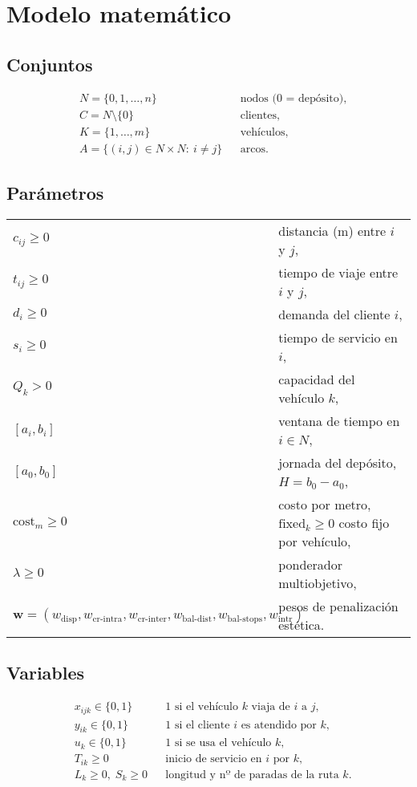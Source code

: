 \documentclass[11pt, a4paper]{article}
\begin{document}
\section{Modelo matemático}

\subsection{Conjuntos}
\begin{align*}
&N=\{0,1,\dots,n\} && \text{nodos (0 = depósito)},\\
&C=N\setminus\{0\} && \text{clientes},\\
&K=\{1,\dots,m\} && \text{vehículos},\\
&A=\{(i,j)\in N\times N:\ i\neq j\} && \text{arcos}.
\end{align*}

\subsection{Parámetros}
\begin{tabularx}{\textwidth}{@{}lX@{}}
$c_{ij}\ge 0$ & distancia (m) entre $i$ y $j$,\\
$t_{ij}\ge 0$ & tiempo de viaje entre $i$ y $j$,\\
$d_i\ge 0$ & demanda del cliente $i$,\\
$s_i\ge 0$ & tiempo de servicio en $i$,\\
$Q_k>0$ & capacidad del vehículo $k$,\\
$[a_i,b_i]$ & ventana de tiempo en $i\in N$,\\
$[a_0,b_0]$ & jornada del depósito, $H=b_0-a_0$,\\
$\mathrm{cost}_m\ge 0$ & costo por metro, \quad $\mathrm{fixed}_k\ge 0$ costo fijo por vehículo,\\
$\lambda\ge 0$ & ponderador multiobjetivo,\\
$\mathbf{w}=(w_{\text{disp}}, w_{\text{cr-intra}}, w_{\text{cr-inter}}, w_{\text{bal-dist}}, w_{\text{bal-stops}}, w_{\text{intr}})$ 
& pesos de penalización estética.\\
\end{tabularx}


\subsection{Variables}
\begin{align*}
&x_{ijk}\in\{0,1\} && \text{1 si el vehículo } k \text{ viaja de } i \text{ a } j,\\
&y_{ik}\in\{0,1\} && \text{1 si el cliente } i \text{ es atendido por } k,\\
&u_k\in\{0,1\} && \text{1 si se usa el vehículo } k,\\
&T_{ik}\ge 0 && \text{inicio de servicio en } i \text{ por } k,\\
&L_k\ge 0,\; S_k\ge 0 && \text{longitud y nº de paradas de la ruta } k.
\end{align*}
\end{document}
